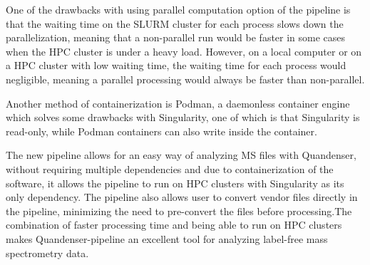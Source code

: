 \documentclass[11pt]{article}
\begin{document}
One of the drawbacks with using parallel computation option of the pipeline is that the waiting time on the SLURM cluster for each process slows down the parallelization, meaning that a non-parallel run would be faster in some cases when the HPC cluster is under a heavy load. However, on a local computer or on a HPC cluster with low waiting time, the waiting time for each process would negligible, meaning a parallel processing would always be faster than non-parallel.

Another method of containerization is Podman, a daemonless container engine which solves some drawbacks with Singularity, one of which is that Singularity is read-only, while Podman containers can also write inside the container.


The new pipeline allows for an easy way of analyzing MS files with Quandenser, without requiring multiple dependencies and due to containerization of the software, it allows the pipeline to run on HPC clusters with Singularity as its only dependency. The pipeline also allows user to convert vendor files directly in the pipeline, minimizing the need to pre-convert the files before processing.The combination of faster processing time and being able to run on HPC clusters makes Quandenser-pipeline an excellent tool for analyzing label-free mass spectrometry data.



\end{document}
